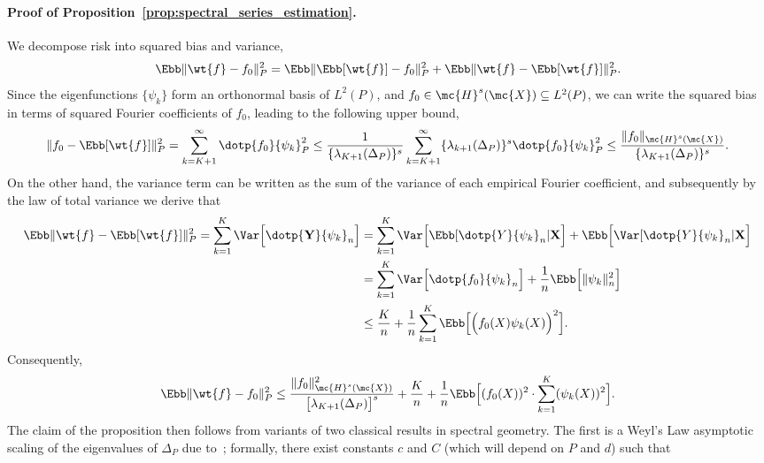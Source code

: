 \paragraph{Proof of Proposition~\ref{prop:spectral_series_estimation}.}
We decompose risk into squared bias and variance,
\begin{equation}
\label{pf:spectral_series_estimation_0}
\Ebb \|\wt{f} - f_0\|_P^2 = \Ebb\| \Ebb[\wt{f}]  - f_0\|_P^2 + \Ebb\| \wt{f} - \Ebb[\wt{f}]\|_P^2.
\end{equation}
Since the eigenfunctions $\{\psi_k\}$ form an orthonormal basis of $L^2(P)$, and $f_0 \in \mc{H}^{s}(\mc{X}) \subseteq L^2(P)$, we can write the squared bias in terms of squared Fourier coefficients of $f_0$, leading to the following upper bound,
\begin{equation*}
\|f_0 - \Ebb[\wt{f}]\|_P^2 = \sum_{k = K + 1}^{\infty}  \dotp{f_0}{\psi_k}_P^2 \leq  \frac{1}{\{\lambda_{K + 1}(\Delta_P)\}^s} \sum_{k = K + 1}^{\infty} \{\lambda_{k + 1}(\Delta_P)\}^s \dotp{f_0}{\psi_k}_P^2 \leq \frac{\|f_0\|_{\mc{H}^s(\mc{X})}}{\{\lambda_{K + 1}(\Delta_P)\}^s}.
\end{equation*}
On the other hand, the variance term can be written as the sum of the variance of each empirical Fourier coefficient, and subsequently by the law of total variance we derive that
\begin{align}
\label{pf:spectral_series_estimation_2}
\Ebb\| \wt{f} - \Ebb[\wt{f}]\|_P^2 = \sum_{k = 1}^{K} \Var\Bigl[\dotp{{\bf Y}}{\psi_k}_n\Bigr] & = \sum_{k = 1}^{K} \Var\Bigl[\Ebb[\dotp{Y}{\psi_k}_n|{\bf X}\Bigr] + \Ebb\Bigl[\Var[\dotp{Y}{\psi_k}_n|{\bf X}\Bigr] \nonumber \\
& = \sum_{k = 1}^{K} \Var\Bigl[\dotp{f_0}{\psi_k}_n\Bigr] + \frac{1}{n}\Ebb\Bigl[\|\psi_k\|_n^2\Bigr] \nonumber \\
& \leq \frac{K}{n} + \frac{1}{n}\sum_{k = 1}^{K}\Ebb\Bigl[\Bigl(f_0(X)\psi_k(X)\Bigr)^2\Bigr].
\end{align}
Consequently,
\begin{equation}
\label{pf:spectral_series_estimation_1}
\Ebb \|\wt{f} - f_0\|_P^2 \leq \frac{\|f_0\|_{\mc{H}^s(\mc{X})}^2}{\bigl[\lambda_{K + 1}(\Delta_P)\bigr]^s} + \frac{K}{n} + \frac{1}{n}\Ebb\Bigl[(f_0(X))^2 \cdot \sum_{k = 1}^{K} (\psi_k(X))^2\Bigr].
\end{equation}
The claim of the proposition then follows from variants of two classical results in spectral geometry. The first is a Weyl's Law asymptotic scaling of the eigenvalues of $\Delta_P$ due to~\cite{dunlop2020}; formally, there exist constants $c$ and $C$ (which will depend on $P$ and $d$) such that
